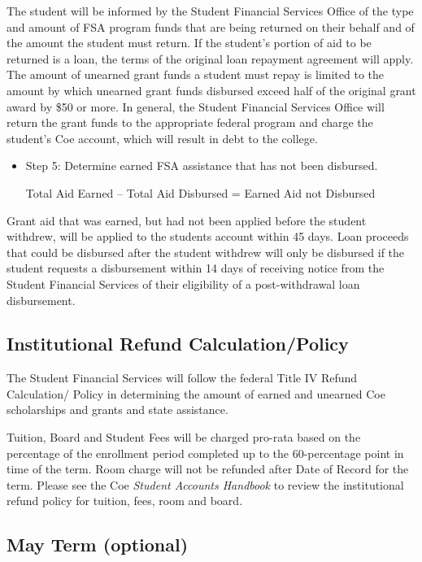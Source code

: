 \documentclass[
  letterpaper,
]{scrbook}
\begin{document}
The student will be informed by the Student Financial Services Office of
the type and amount of FSA program funds that are being returned on
their behalf and of the amount the student must return. If the student's
portion of aid to be returned is a loan, the terms of the original loan
repayment agreement will apply. The amount of unearned grant funds a
student must repay is limited to the amount by which unearned grant
funds disbursed exceed half of the original grant award by \$50 or more.
In general, the Student Financial Services Office will return the grant
funds to the appropriate federal program and charge the student's Coe
account, which will result in debt to the college.

\begin{itemize}
\item
  Step 5: Determine earned FSA assistance that has not been disbursed.

  Total Aid Earned -- Total Aid Disbursed = Earned Aid not Disbursed
\end{itemize}

Grant aid that was earned, but had not been applied before the student
withdrew, will be applied to the students account within 45 days. Loan
proceeds that could be disbursed after the student withdrew will only be
disbursed if the student requests a disbursement within 14 days of
receiving notice from the Student Financial Services of their
eligibility of a post-withdrawal loan disbursement.

\subsection{Institutional Refund
Calculation/Policy}\label{institutional-refund-calculationpolicy}

The Student Financial Services will follow the federal Title IV Refund
Calculation/ Policy in determining the amount of earned and unearned Coe
scholarships and grants and state assistance.

Tuition, Board and Student Fees will be charged pro-rata based on the
percentage of the enrollment period completed up to the 60-percentage
point in time of the term. Room charge will not be refunded after Date
of Record for the term. Please see the Coe \emph{Student Accounts
Handbook} to review the institutional refund policy for tuition, fees,
room and board.

\subsection{May Term (optional)}\label{may-term-optional-1}
\end{document}
